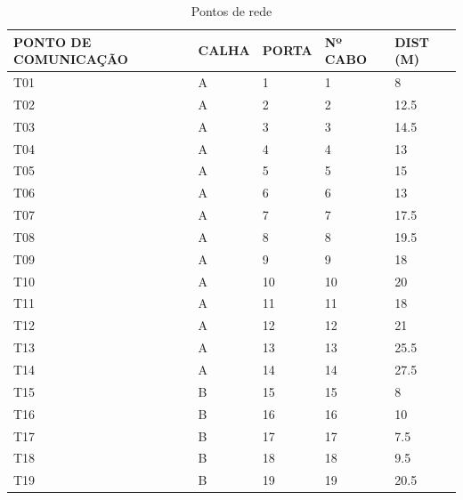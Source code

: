 \documentclass[	DIV=calc,%
paper=a4,%
fontsize=12pt,%
onecolumn]{scrartcl}	 					%
\begin{document}
\begin{table}[h]
	\footnotesize
	\centering
	\caption{Pontos de rede}	
	\label{tab3} %
		\begin{tabular}{lllll}
			\toprule
			{\textbf{PONTO DE COMUNICAÇÃO}} & {\textbf{CALHA}} & {\textbf{PORTA}} & {\textbf{Nº CABO}} & {\textbf{DIST (M)}}    \\
			\midrule
		T01                  & A     & 1                 & 1        & 8        \\
		T02                  & A     & 2                 & 2        & 12.5     \\
		T03                  & A     & 3                 & 3        & 14.5     \\
		T04                  & A     & 4                 & 4        & 13       \\
		T05                  & A     & 5                 & 5        & 15       \\
		T06                  & A     & 6                 & 6        & 13       \\
		T07                  & A     & 7                 & 7        & 17.5     \\
		T08                  & A     & 8                 & 8        & 19.5     \\
		T09                  & A     & 9                 & 9        & 18       \\
		T10                  & A     & 10                & 10       & 20       \\
		T11                  & A     & 11                & 11       & 18       \\
		T12                  & A     & 12                & 12       & 21       \\
		T13                  & A     & 13                & 13       & 25.5     \\
		T14                  & A     & 14                & 14       & 27.5     \\
		T15                  & B     & 15                & 15       & 8        \\
		T16                  & B     & 16                & 16       & 10       \\
		T17                  & B     & 17                & 17       & 7.5      \\
		T18                  & B     & 18                & 18       & 9.5      \\
		T19                  & B     & 19                & 19       & 20.5     \\

\end{tabular}
\end{table}
\end{document}
